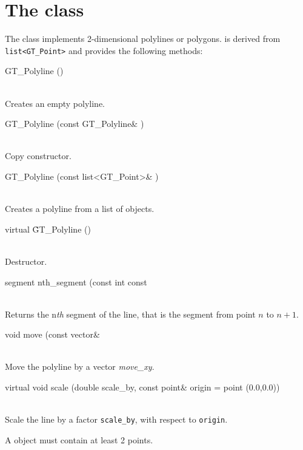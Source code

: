 \documentclass[twoside,fleqn]{report}
\begin{document}
%
%

\section{The class }


The class  implements 2-dimensional polylines or 
polygons.   is derived from \verb|list<GT_Point>| and 
provides the following methods:

\begin{Cdefinition}

  \item[GT\_Polyline ()] \strut\\
  Creates an empty polyline.
  \item[GT\_Polyline (const GT\_Polyline\& \Param{l})] \strut\\
  Copy constructor.
  \item[GT\_Polyline (const list<GT\_Point>\& \Param{l})] \strut\\
  Creates a polyline from a list of  objects.
  \item[virtual \~GT\_Polyline ()] \strut\\
  Destructor.

  \item[segment nth\_segment (const int \Param{n} const] \strut\\
  Returns the n\emph{th} segment of the line, that is the segment from 
  point $n$ to $n+1$.

  \item[void move (const vector\& \Param{move\_xy}] \strut\\
  Move the polyline by a vector \emph{move\_xy}.

  \item[virtual void scale (double scale\_by, const point\& origin = point (0.0,0.0))] \strut\\
  Scale the line by a factor \texttt{scale\_by}, with respect to
  \texttt{origin}.

\end{Cdefinition}

\begin{notes}
  \item A  object must contain at least 2 points.
\end{notes}

%
%
\end{document}

